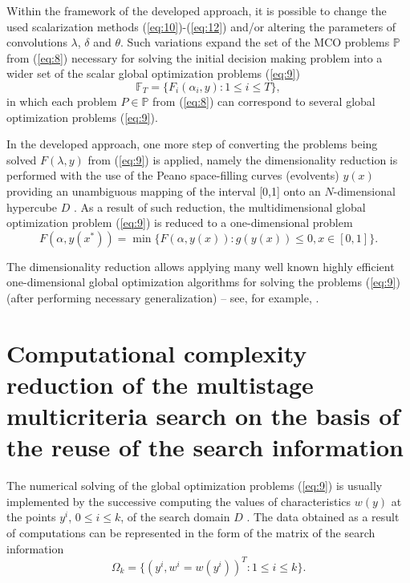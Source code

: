 \documentclass[runningheads]{llncs}
\begin{document}
Within the framework of the developed approach, it is possible to change the used scalarization methods (\ref{eq:10})-(\ref{eq:12}) and/or altering the parameters of convolutions $\lambda$, $\delta$ and $\theta$. Such variations expand the set of the MCO problems $\mathbb{P}$ from (\ref{eq:8}) necessary for solving the initial decision making problem into a wider set of the scalar global optimization problems (\ref{eq:9})
\begin{equation}\label{eq:13}
	\mathbb{F}_T=\{ F_i (\alpha_i,y): 1\leq i \leq T \},
\end{equation}
in which each problem $P\in \mathbb{P}$ from (\ref{eq:8}) can correspond to several global optimization problems (\ref{eq:9}).

In the developed approach, one more step of converting the problems being solved $F(\lambda,y)$ from (\ref{eq:9}) is applied, namely the dimensionality reduction is performed with the use of the Peano space-filling curves (evolvents) $y(x)$ providing an unambiguous mapping of the interval [0,1] onto an $N$-dimensional hypercube $D$ \cite{c11,c12}. As a result of such reduction, the multidimensional global optimization problem (\ref{eq:9}) is reduced to a one-dimensional problem
\begin{equation}\label{eq:14}
	F(\alpha,y(x^* ))=\min{\{ F(\alpha,y(x)) : g(y(x))\leq 0, x\in[0,1] \}.}
\end{equation}

The dimensionality reduction allows applying many well known highly efficient one-dimensional global optimization algorithms for solving the problems (\ref{eq:9}) (after performing necessary generalization) -- see, for example, \cite{c11,c12,c13,c14,c15}.


\section{Computational complexity reduction of the multistage multicriteria search on the basis of the reuse of the search information}	
\label{sec:04}

The numerical solving of the global optimization problems (\ref{eq:9}) is usually implemented by the successive computing the values of characteristics $w(y)$ at the points $y^i$, $0\leq i\leq k$, of the search domain $D$ \cite{c11,c14}. The data obtained as a result of computations can be represented in the form of the matrix of the search information
\begin{equation}\label{eq:15}
	\Omega_k=\{ (y^i,w^i=w(y^i ))^T: 1\leq i \leq k \}.
\end{equation}
\end{document}
